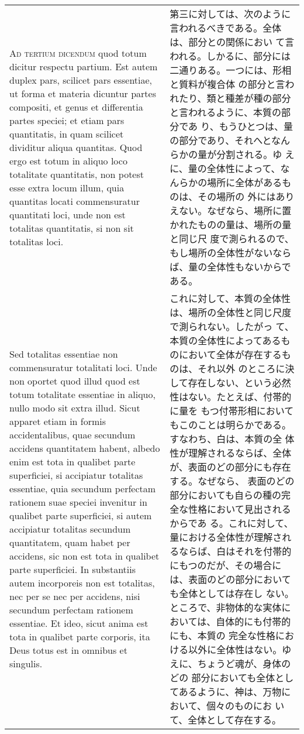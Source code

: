 \documentclass[10pt]{jsarticle} %
\begin{document}
\begin{longtable}{p{21em}p{21em}}
\\

{\scshape Ad tertium dicendum} quod totum dicitur respectu partium. Est autem
 duplex pars, scilicet pars essentiae, ut forma et materia dicuntur
 partes compositi, et genus et differentia partes speciei; et etiam pars
 quantitatis, in quam scilicet dividitur aliqua quantitas. Quod ergo est
 totum in aliquo loco totalitate quantitatis, non potest esse extra
 locum illum, quia quantitas locati commensuratur quantitati loci, unde
 non est totalitas quantitatis, si non sit totalitas loci. 

&

第三に対しては、次のように言われるべきである。全体は、部分との関係におい
 て言われる。しかるに、部分には二通りある。一つには、形相と質料が複合体
 の部分と言われたり、類と種差が種の部分と言われるように、本質の部分であ
 り、もうひとつは、量の部分であり、それへとなんらかの量が分割される。ゆ
 えに、量の全体性によって、なんらかの場所に全体があるものは、その場所の
 外にはありえない。なぜなら、場所に置かれたものの量は、場所の量と同じ尺
 度で測られるので、もし場所の全体性がないならば、量の全体性もないからで
 ある。

\\

Sed totalitas essentiae non commensuratur totalitati loci. Unde
 non oportet quod illud quod est totum totalitate essentiae in aliquo,
 nullo modo sit extra illud. Sicut apparet etiam in formis
 accidentalibus, quae secundum accidens quantitatem habent, albedo enim
 est tota in qualibet parte superficiei, si accipiatur totalitas
 essentiae, quia secundum perfectam rationem suae speciei invenitur in
 qualibet parte superficiei, si autem accipiatur totalitas secundum
 quantitatem, quam habet per accidens, sic non est tota in qualibet
 parte superficiei. In substantiis autem incorporeis non est totalitas,
 nec per se nec per accidens, nisi secundum perfectam rationem
 essentiae. Et ideo, sicut anima est tota in qualibet parte corporis,
 ita Deus totus est in omnibus et singulis.

&

これに対して、本質の全体性は、場所の全体性と同じ尺度で測られない。したがっ
 て、本質の全体性によってあるものにおいて全体が存在するものは、それ以外
 のところに決して存在しない、という必然性はない。たとえば、付帯的に量を
 もつ付帯形相においてもこのことは明らかである。すなわち、白は、本質の全
 体性が理解されるならば、全体が、表面のどの部分にも存在する。なぜなら、
 表面のどの部分においても自らの種の完全な性格において見出されるからであ
 る。これに対して、量における全体性が理解されるならば、白はそれを付帯的
 にもつのだが、その場合には、表面のどの部分においても全体としては存在し
 ない。ところで、非物体的な実体においては、自体的にも付帯的にも、本質の
 完全な性格における以外に全体性はない。ゆえに、ちょうど魂が、身体のどの
 部分においても全体としてあるように、神は、万物において、個々のものにお
 いて、全体として存在する。


\end{longtable}
\newpage
{} 
\end{document}

